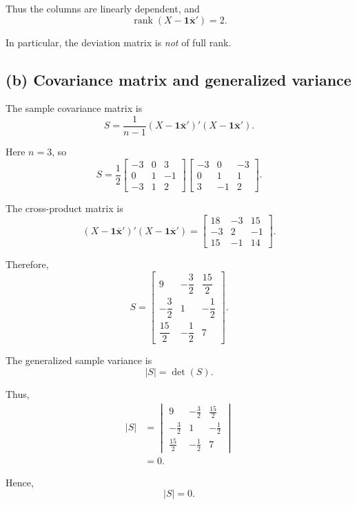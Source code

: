 \documentclass[12pt,a4paper]{article}
\newcommand{\one}{\mathbf{1}}
\begin{document}
Thus the columns are linearly dependent, and
\[
\boxed{\operatorname{rank}(X-\one\overline{\mathbf{x}}')=2}.
\]

In particular, the deviation matrix is \emph{not} of full rank.

\subsection*{(b) Covariance matrix and generalized variance}

The sample covariance matrix is
\[
S
=
\frac{1}{n-1}
(X-\one\overline{\mathbf{x}}')'
(X-\one\overline{\mathbf{x}}').
\]

Here \(n=3\), so
\[
S
=
\frac12
\begin{bmatrix}
-3&0&3\\
0&1&-1\\
-3&1&2
\end{bmatrix}
\begin{bmatrix}
-3&0&-3\\
0&1&1\\
3&-1&2
\end{bmatrix}.
\]

The cross-product matrix is
\[
(X-\one\overline{\mathbf{x}}')'
(X-\one\overline{\mathbf{x}}')
=
\begin{bmatrix}
18&-3&15\\
-3&2&-1\\
15&-1&14
\end{bmatrix}.
\]

Therefore,
\[
\boxed{
S=
\begin{bmatrix}
9&-\dfrac32&\dfrac{15}{2}\\[5pt]
-\dfrac32&1&-\dfrac12\\[5pt]
\dfrac{15}{2}&-\dfrac12&7
\end{bmatrix}}.
\]

The generalized sample variance is
\[
|S|=\det(S).
\]

Thus,
\[
\begin{aligned}
|S|
&=
\begin{vmatrix}
9&-\frac32&\frac{15}{2}\\
-\frac32&1&-\frac12\\
\frac{15}{2}&-\frac12&7
\end{vmatrix}\\[4pt]
&=0.
\end{aligned}
\]

Hence,
\[
\boxed{|S|=0}.
\]
\end{document}
